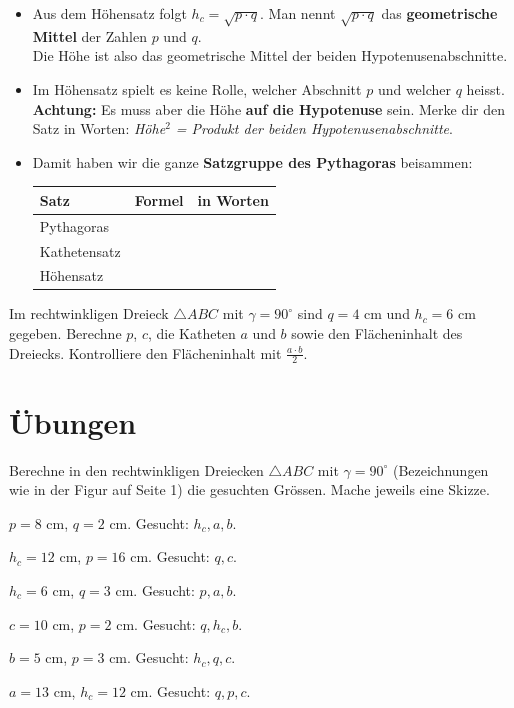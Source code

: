 \documentclass[11pt,oneside]{article}
\begin{document}
\begin{itemize}
	\item Aus dem Höhensatz folgt $h_c=\sqrt{p\cdot q}$. Man nennt $\sqrt{p\cdot q}$ das \textbf{geometrische Mittel} der Zahlen $p$ und $q$.\\ Die Höhe ist also das geometrische Mittel der beiden Hypotenusenabschnitte.
	\item Im Höhensatz spielt es keine Rolle, welcher Abschnitt $p$ und welcher $q$ heisst. \textbf{Achtung:} Es muss aber die Höhe \textbf{auf die Hypotenuse} sein. Merke dir den Satz in Worten: \textit{Höhe$^2$ = Produkt der beiden Hypotenusenabschnitte}.
	\item Damit haben wir die ganze \textbf{Satzgruppe des Pythagoras} beisammen:
	\begin{center}
		\renewcommand{\arraystretch}{1.6}
		\begin{tabular}{|l|p{45mm}|p{55mm}|}\hline
			\textbf{Satz} & \textbf{Formel} & \textbf{in Worten}\\\hline
			Pythagoras & & \\\hline
			Kathetensatz & & \\\hline
			Höhensatz & & \\\hline
		\end{tabular}
	\end{center}
\end{itemize}

\begin{beispiel}
	Im rechtwinkligen Dreieck $\triangle ABC$ mit $\gamma=90^\circ$ sind $q=4$ cm und $h_c=6$ cm gegeben. Berechne $p$, $c$, die Katheten $a$ und $b$ sowie den Flächeninhalt des Dreiecks. Kontrolliere den Flächeninhalt mit $\frac{a\cdot b}{2}$.
\end{beispiel}

\section{Übungen}
\setcounter{aufg}{0}
\begin{aufgabe}[Grundaufgaben] %
	Berechne in den rechtwinkligen Dreiecken $\triangle ABC$ mit $\gamma=90^\circ$ (Bezeichnungen wie in der Figur auf Seite 1) die gesuchten Grössen. Mache jeweils eine Skizze.
	\begin{enumcols}[2]
		\item $p=8$ cm, $q=2$ cm. Gesucht: $h_c,a,b$.
		\item $h_c=12$ cm, $p=16$ cm. Gesucht: $q,c$.
		\item $h_c=6$ cm, $q=3$ cm. Gesucht: $p,a,b$.
		\item $c=10$ cm, $p=2$ cm. Gesucht: $q,h_c,b$.
		\item $b=5$ cm, $p=3$ cm. Gesucht: $h_c,q,c$.
		\item $a=13$ cm, $h_c=12$ cm. Gesucht: $q,p,c$.
	\end{enumcols}
\end{aufgabe}
\end{document}
